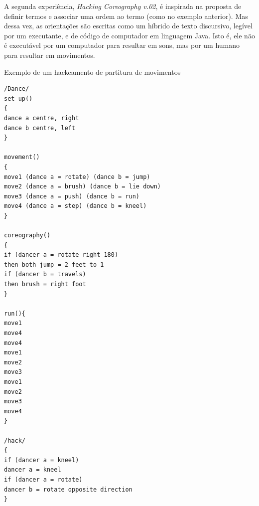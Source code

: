 \begin{citacao}
\end{citacao}

A segunda experiência, \emph{Hacking Coreography v.02}, é inspirada na proposta de definir termos e associar uma ordem ao termo (como no exemplo anterior). Mas dessa vez, as orientações são escritas como um híbrido de texto discursivo, legível por um executante, e de código de computador em linguagem Java. Isto é, ele não é executável por um computador para resultar em sons, mas por um humano para resultar em movimentos.

\begin{example}{Exemplo de um hackeamento de partitura de movimentos}
\begin{verbatim}
/Dance/
set up()
{
dance a centre, right
dance b centre, left
}

movement()
{
move1 (dance a = rotate) (dance b = jump)
move2 (dance a = brush) (dance b = lie down)
move3 (dance a = push) (dance b = run)
move4 (dance a = step) (dance b = kneel)
}

coreography()
{
if (dancer a = rotate right 180)
then both jump = 2 feet to 1
if (dancer b = travels)
then brush = right foot
}

run(){
move1
move4
move4
move1
move2
move3
move1
move2
move3
move4
}

/hack/
{
if (dancer a = kneel)
dancer a = kneel
if (dancer a = rotate)
dancer b = rotate opposite direction 
}
\end{verbatim}
\end{example}

